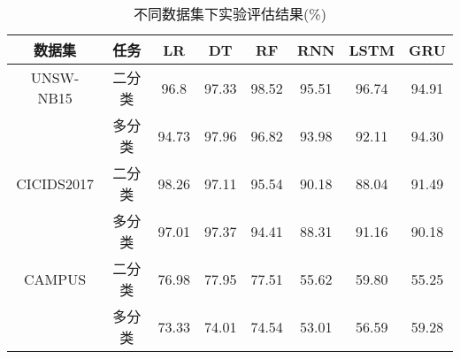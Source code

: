 \begin{table*}[h]
    \small
    \caption{不同数据集下实验评估结果(\%)}
    \label{不同数据集下实验评估结果}
    \centering
    \begin{tabular}{c|c|ccc|ccc}
    \toprule
    
     数据集 &  任务  &  
     LR &  DT & RF & RNN & LSTM & GRU  \\
    \midrule
    
    UNSW-NB15 & 二分类 & 96.8 & 97.33 & 98.52 &  95.51 & 96.74 & 94.91  \\ 
    
    & 多分类 &94.73 & 97.96 & 96.82 & 93.98 & 92.11 & 94.30  \\
    
    \midrule
    CICIDS2017 & 二分类 & 98.26 & 97.11 & 95.54 & 90.18 & 88.04 & 91.49  \\
    & 多分类 & 97.01 & 97.37 & 94.41 & 88.31 & 91.16 & 90.18 \\
    \midrule
    CAMPUS & 二分类 & 76.98 & 77.95 & 77.51 & 55.62 & 59.80 & 55.25 \\
    & 多分类 & 73.33 & 74.01 & 74.54 & 53.01 & 56.59 & 59.28 \\
   
     \bottomrule
    
    \end{tabular}
    \end{table*}

  
  
  
  
  
